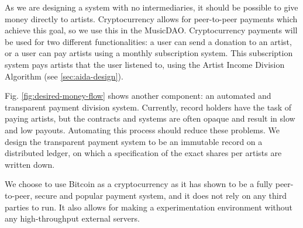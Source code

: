 As we are designing a system with no intermediaries, it should be possible to give money directly to artists. Cryptocurrency allows for peer-to-peer payments which achieve this goal, so we use this in the MusicDAO. Cryptocurrency payments will be used for two different functionalities: a user can send a donation to an artist, or a user can pay artists using a monthly subscription system. This subscription system pays artists that the user listened to, using the Artist Income Division Algorithm (see \ref{sec:aida-design}). 

Fig. \ref{fig:desired-money-flow} shows another component: an automated and transparent payment division system. Currently, record holders have the task of paying artists, but the contracts and systems are often opaque and result in slow and low payouts. Automating this process should reduce these problems. We design the transparent payment system to be an immutable record on a distributed ledger, on which a specification of the exact shares per artists are written down.

We choose to use Bitcoin as a cryptocurrency as it has shown to be a fully peer-to-peer, secure and popular payment system, and it does not rely on any third parties to run. It also allows for making a experimentation environment without any high-throughput external servers. 

